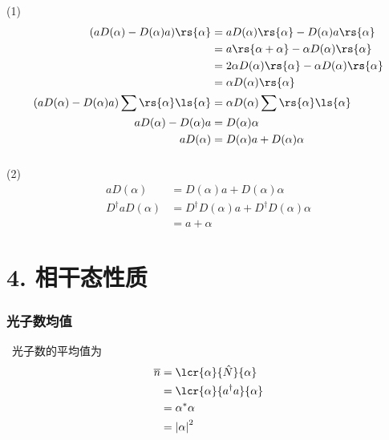 \begin{frame}
      \frametitle{}
      \例 [5. 试证明位移算符有如下性质 ]{
          \[ a D (\alpha) =  D (\alpha) a  +  D (\alpha)\alpha \]
       \[ D^\dagger (\alpha) a D (\alpha) = a + \alpha; \qquad D^\dagger (\alpha) a^\dagger D (\alpha) = a^\dagger + \alpha^* \]   
      }
      \证 (1)~
    \[ 
      \begin{aligned}
        (a D (\alpha) -  D (\alpha) a) \rs{\alpha} &= a D (\alpha) \rs{\alpha}- D (\alpha) a \rs{\alpha} \\ 
        &= a \rs{\alpha+\alpha} - \alpha D (\alpha) \rs{\alpha} \\
        &= 2\alpha D (\alpha) \rs{\alpha} -  \alpha D (\alpha) \rs{\alpha} \\
        &= \alpha D (\alpha) \rs{\alpha} \\
        (a D (\alpha) -  D (\alpha) a) \sum \rs{\alpha}\ls{\alpha } &=  \alpha D (\alpha) \sum\rs{\alpha}\ls{\alpha }  \\ 
        a D (\alpha) -  D (\alpha) a &=  D (\alpha) \alpha  \\ 
        a D (\alpha) &= D (\alpha)  a + D (\alpha) \alpha  \\ 
    \end{aligned}  
    \] 
\end{frame}

\begin{frame}
 \frametitle{}
   (2) 
   \[ 
    \begin{aligned}
        a D (\alpha) &=  D (\alpha) a  +  D (\alpha)\alpha  \\
        D^\dagger  a D (\alpha) &= D^\dagger D (\alpha) a  + D^\dagger D (\alpha)\alpha  \\
        &= a + \alpha
  \end{aligned}  
  \] 
\end{frame}

\section{4. 相干态性质}

\begin{frame}
    \frametitle{光子数均值}
        \解 ~光子数的平均值为    
    \[ \begin{aligned}
     \overline{n} &=\lcr{\alpha}{\hat{N}}{\alpha} \\ 
     &= \lcr{\alpha}{a^{\dagger} a  }{\alpha}  \\ 
     &= \alpha^* \alpha \\ 
     &= \left| \alpha\right|^2  \\ 
    \end{aligned}\]
\end{frame}


